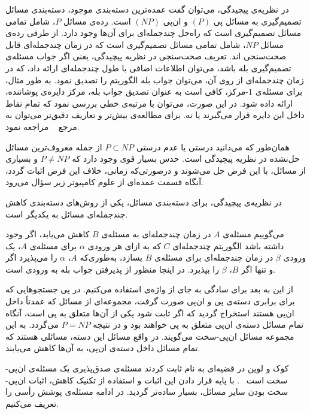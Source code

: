 
در نظریه‌ی پیچیدگی، می‌توان گفت عمده‌ترین دسته‌بندی موجود، دسته‌بندی مسائل تصمیم‌گیری به مسائل پی $(P)$ و ان‌پی $(NP)$ است.
رده‌ی مسائل $P$، شامل تمامی مسائل تصمیم‌گیری است که راه‌حل چندجمله‌ای برای آن‌ها وجود دارد.
از طرفی رده‌ی مسائل $NP$، شامل تمامی مسائل تصمیم‌گیری است که در زمان چندجمله‌ای قابل صحت‌سنجی اند.
تعریف صحت‌سنجی در نظریه پیچیدگی، یعنی اگر جواب مسئله‌ی تصمیم‌گیری بله باشد، می‌توان اطلاعات اضافی با طول چندجمله‌ای ارائه داد، که در زمان چندجمله‌ای از روی آن، می‌توان جواب بله الگوریتم را تصدیق نمود.
به طور مثال، برای مسئله‌ی $1$-مرکز، کافی است به عنوان تصدیق جواب بله، مرکز دایره‌ی پوشاننده، ارائه داده شود.
در این صورت، می‌توان با مرتبه‌ی خطی بررسی نمود که تمام نقاط داخل این دایره قرار می‌گیرند یا نه.
برای مطالعه‌ی بیش‌تر و تعاریف دقیق‌تر می‌توان به مرجع ~ مراجعه نمود.

همان‌طور که می‌دانید درستی یا عدم درستی $P \subset NP$ از جمله معروف‌ترین مسائل حل‌نشده در نظریه پیچیدگی است.
حدس بسیار قوی وجود دارد که $P \neq NP$ و بسیاری از مسائل، با این فرض حل می‌شوند و درصورتی‌که زمانی، خلاف این فرض اثبات گردد، آنگاه قسمت عمده‌ای از علوم کامپیوتر زیر سؤال می‌رود.

در نظریه‌ی پیچیدگی، برای دسته‌بندی مسائل، یکی از روش‌های دسته‌بندی کاهش چندجمله‌ای مسائل به یکدیگر است. 


می‌گوییم مسئله‌ی $A$ در زمان چندجمله‌ای به مسئله‌ی $B$ کاهش می‌یابد، اگر وجود داشته باشد الگوریتم چندجمله‌ای $C$ که به ازای هر ورودی $\alpha$ برای مسئله‌ی $A$، یک ورودی $\beta$ در زمان چندجمله‌ای برای مسئله‌ی $B$ بسازد، به‌طوری‌که $A$، $\alpha$ را می‌پذیرد اگر و تنها اگر $B$، $\beta$ را بپذیرد. در اینجا منظور از پذیرفتن جواب بله به ورودی است.


از این به بعد برای سادگی به جای  از واژه‌ی  استفاده می‌کنیم.
در پی جستجوهایی که برای برابری دسته‌ی پی و ان‌پی صورت گرفت، مجموعه‌ای از مسائل که عمدتاً داخل ان‌پی هستند استخراج گردید که اگر ثابت شود یکی از آن‌ها متعلق به پی است، آنگاه تمام مسائل دسته‌ی ان‌پی متعلق به پی خواهند بود و در نتیجه $P = NP$ می‌گردد.
به این مجموعه مسائل ان‌پی-سخت می‌گویند.
در واقع مسائل این دسته، مسائلی هستند که تمام مسائل داخل دسته‌ی ان‌پی، به آن‌ها کاهش می‌یابند.

کوک و لوین در قضیه‌ای به نام  ثابت کردند مسئله‌ی صدق‌پذیری یک مسئله‌ی ان‌پی-سخت است ~.
با پایه قرار دادن این اثبات و استفاده از تکنیک کاهش، اثبات ان‌پی-سخت بودن سایر مسائل، بسیار ساده‌تر گردید.
در ادامه مسئله‌ی پوشش رأسی را تعریف می‌کنیم.


